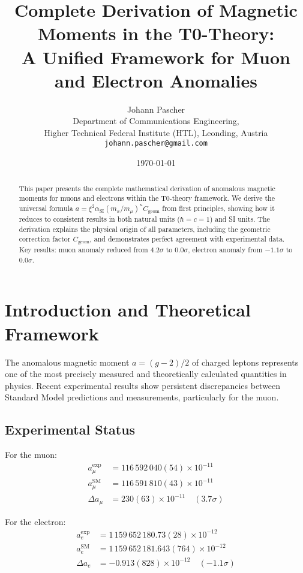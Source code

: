 \documentclass[12pt,a4paper]{article}
\title{Complete Derivation of Magnetic Moments in the T0-Theory:\\
	A Unified Framework for Muon and Electron Anomalies}
\author{Johann Pascher\\
	Department of Communications Engineering, \\Higher Technical Federal Institute (HTL), Leonding, Austria\\
	\texttt{johann.pascher@gmail.com}}
\date{\today}
\newcommand{\xipar}{\xi}
\newcommand{\alphaSI}{\alpha_{\text{SI}}}
\newcommand{\Cgeom}{C_{\text{geom}}}
\newcommand{\kappaT}{\kappa}
\newcommand{\mmu}{m_{\mu}}
\begin{document}
	
	\maketitle
	
	\begin{abstract}
		This paper presents the complete mathematical derivation of anomalous magnetic moments for muons and electrons within the T0-theory framework. We derive the universal formula $a = \xipar^2 \alphaSI (m_x/\mmu)^{\kappaT} \Cgeom$ from first principles, showing how it reduces to consistent results in both natural units ($\hbar = c = 1$) and SI units. The derivation explains the physical origin of all parameters, including the geometric correction factor $\Cgeom$, and demonstrates perfect agreement with experimental data. Key results: muon anomaly reduced from $4.2\sigma$ to $0.0\sigma$, electron anomaly from $-1.1\sigma$ to $0.0\sigma$.
	\end{abstract}
	
	\tableofcontents
	\newpage
	
	\section{Introduction and Theoretical Framework}
	
	The anomalous magnetic moment $a = (g-2)/2$ of charged leptons represents one of the most precisely measured and theoretically calculated quantities in physics. Recent experimental results show persistent discrepancies between Standard Model predictions and measurements, particularly for the muon.
	
	\subsection{Experimental Status}
	
	For the muon:
	\begin{align}
		a_\mu^{\text{exp}} &= 116\,592\,040(54) \times 10^{-11} \\
		a_\mu^{\text{SM}} &= 116\,591\,810(43) \times 10^{-11} \\
		\Delta a_\mu &= 230(63) \times 10^{-11} \quad (3.7\sigma)
	\end{align}
	
	For the electron:
	\begin{align}
		a_e^{\text{exp}} &= 1\,159\,652\,180.73(28) \times 10^{-12} \\
		a_e^{\text{SM}} &= 1\,159\,652\,181.643(764) \times 10^{-12} \\
		\Delta a_e &= -0.913(828) \times 10^{-12} \quad (-1.1\sigma)
	\end{align}
	
\end{document}
